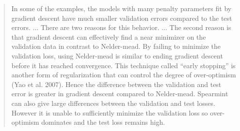 \documentclass[]{article}
\begin{document}
\begin{enumerate}
		\begin{quote}
			In some of the examples, the models with many penalty parameters fit by gradient descent have much smaller validation errors compared to the test errors. ... There are two reasons for this behavior. ... The second reason is that gradient descent can effectively find a near minimizer on the validation data in contrast to Nelder-mead. By failing to minimize the validation loss, using Nelder-mead is similar to ending gradient descent before it has reached convergence. This technique called ``early stopping'' is another form of regularization that can control the degree of over-optimism (Yao et al. 2007). Hence the difference between the validation and test error is greater in gradient descent compared to Nelder-mead. Spearmint can also give large differences between the validation and test losses. However it is unable to sufficiently minimize the validation loss so over-optimism dominates and the test loss remains high.
		\end{quote}
		
		\end{enumerate}
\end{document}
